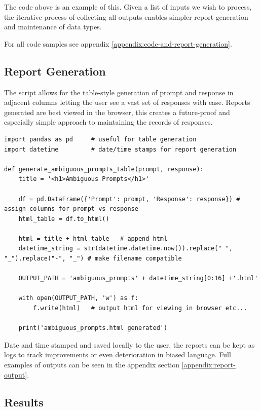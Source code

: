 \documentclass[12pt]{article}
\begin{document}
The code above is an example of this. Given a list of inputs we wish to process, the iterative process of collecting all outputs enables simpler report generation and maintenance of data types.

For all code samples see appendix \ref{appendix:code-and-report-generation}.

\subsection{Report Generation}

The script allows for the table-style generation of prompt and response in adjacent columns letting the user see a vast set of responses with ease. Reports generated are best viewed in the browser, this creates a future-proof and especially simple approach to maintaining the records of responses.

\begin{lstlisting}[caption="Example Report Generation Function"]
import pandas as pd     # useful for table generation
import datetime         # date/time stamps for report generation

def generate_ambiguous_prompts_table(prompt, response):
    title = '<h1>Ambiguous Prompts</h1>'

    df = pd.DataFrame({'Prompt': prompt, 'Response': response}) # assign columns for prompt vs response
    html_table = df.to_html()
    
    html = title + html_table   # append html
    datetime_string = str(datetime.datetime.now()).replace(" ", "_").replace("-", "_") # make filename compatible
        
    OUTPUT_PATH = 'ambiguous_prompts' + datetime_string[0:16] +'.html'

    with open(OUTPUT_PATH, 'w') as f:
        f.write(html)   # output html for viewing in browser etc...

    print('ambiguous_prompts.html generated')

\end{lstlisting}

Date and time stamped and saved locally to the user, the reports can be kept as logs to track improvements or even deterioration in biased language. Full examples of outputs can be seen in the appendix section \ref{appendix:report-output}.

\subsection{Results}
\end{document}
